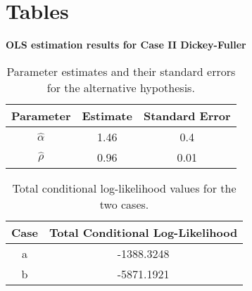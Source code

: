 \documentclass[12pt]{article}
\begin{document}
\newpage
\section{Tables}
\textbf{OLS estimation results for Case II Dickey-Fuller}
\begin{table}[h!]
\centering
\begin{tabular}{|c|c|c|}
\hline
\textbf{Parameter} & \textbf{Estimate} & \textbf{Standard Error} \\ \hline
$\hat{\alpha}$     & 1.46              & 0.4                     \\ \hline
$\hat{\rho}$       & 0.96              & 0.01                    \\ \hline
\end{tabular}
\caption{Parameter estimates and their standard errors for the alternative hypothesis.}
\label{tab:parameter_estimates}
\end{table}

\begin{table}[h!]
\centering
\begin{tabular}{|c|c|}
\hline
\textbf{Case} & \textbf{Total Conditional Log-Likelihood} \\ \hline
a             & -1388.3248                                \\ \hline
b             & -5871.1921                                \\ \hline
\end{tabular}
\caption{Total conditional log-likelihood values for the two cases.}
\label{tab:log_likelihood_results}
\end{table}
\end{document}

